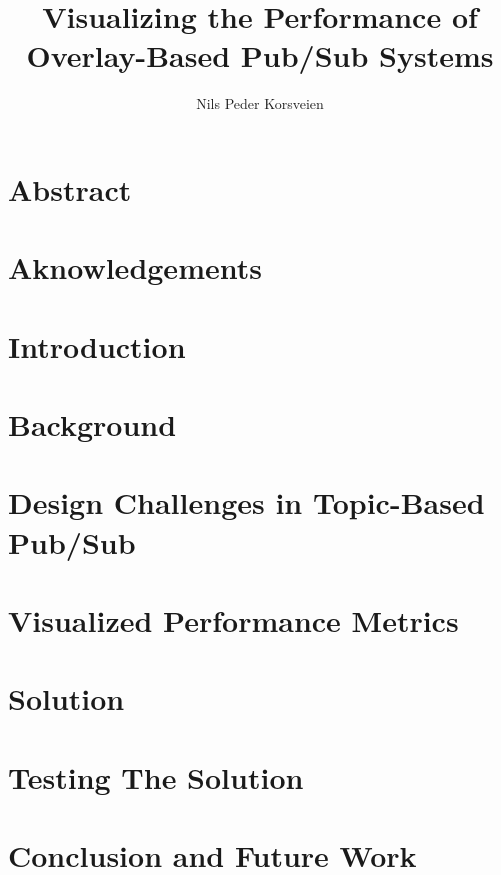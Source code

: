 \documentclass[UKenglish, a4paper]{ifimaster}
\title{Visualizing the Performance of Overlay-Based Pub/Sub Systems}
\subtitle{}
\author{Nils Peder Korsveien}
\begin{document}
\ififorside{}
\frontmatter{}
\maketitle{}

\chapter*{Abstract}
\tableofcontents{}
\listoffigures{}
\listoftables{}
\chapter*{Aknowledgements}
\mainmatter{}

\chapter{Introduction}


\chapter{Background}
\label{ch:background}


\chapter{Design Challenges in Topic-Based Pub/Sub}
\label{ch:design-challenges}


\chapter{Visualized Performance Metrics}
\label{ch:metrics}


\chapter{Solution}
\label{ch:solution}


\chapter{Testing The Solution}
\label{ch:evaluation}


\chapter{Conclusion and Future Work}
\label{ch:conclusion-and-future-work}


\backmatter{}
\printbibliography{}
\end{document}
